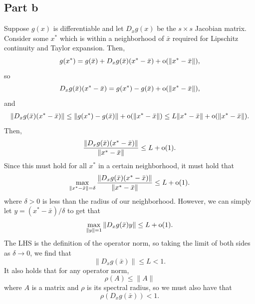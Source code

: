 \documentclass{article}
\begin{document}
\subsection{Part b}
Suppose $g(x)$ is differentiable and let $D_xg(x)$ be the $s\times s$
Jacobian matrix. Consider some $x^*$ which is within a neighborhood of $\bar{x}$ required for Lipschitz continuity and Taylor expansion. Then,
\[
g(x^*)=g(\bar{x})+D_xg(\bar{x})(x^*-\bar{x})+\operatorname{o}(\|x^*-\bar{x}\|),
\]
so
\[
D_xg(\bar{x})(x^*-\bar{x})=g(x^*)-g(\bar{x})+\operatorname{o}(\|x^*-\bar{x}\|),
\]
and 
\begin{align*}
\|D_xg(\bar{x})(x^*-\bar{x})\|\leq\|g(x^*)-g(\bar{x})\|+\operatorname{o}(\|x^*-\bar{x}\|)\leq L\|x^*-\bar{x}\|+\operatorname{o}(\|x^*-\bar{x}\|).
\end{align*}
Then,
\[
\frac{\|D_xg(\bar{x})(x^*-\bar{x})\|}{\|x^*-\bar{x}\|}\leq L+\operatorname{o}(1).
\]
Since this must hold for all $x^*$ in a certain neighborhood, it must hold that 
\[
\max_{\|x^*-\bar{x}\|=\delta}\frac{\|D_xg(\bar{x})(x^*-\bar{x})\|}{\|x^*-\bar{x}\|}\leq L+\operatorname{o}(1).
\]
where $\delta>0$ is less than the radius of our neighborhood. However, we can simply let $y=(x^*-\bar{x})/\delta$ to get that 
\[
\max_{\|y\|=1}\|D_xg(\bar{x})y\|\leq L+\operatorname{o}(1).
\]
The LHS is the definition of the operator norm, so taking the limit of both sides as $\delta\to0$, we find that 
\[
\|D_xg(\bar{x})\|\leq L<1.
\]
It also holds that for any operator norm,
\[
\rho(A)\leq\|A\|
\]
where $A$ is a matrix and $\rho$ is its spectral radius, so we must also have that 
\[
\rho(D_xg(\bar{x}))<1.
\]
\end{document}
